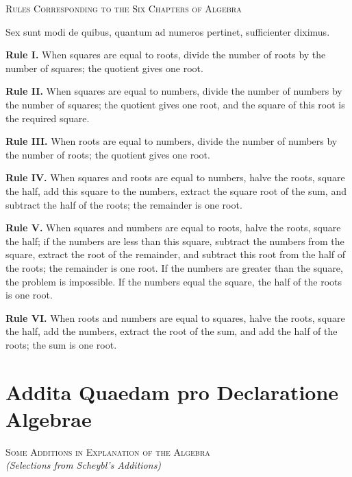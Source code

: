 \documentclass[11pt,a4paper]{book}
\begin{document}
\begin{center}
\textsc{Rules Corresponding to the Six Chapters of Algebra}
\end{center}

\textlatin{Sex sunt modi de quibus, quantum ad numeros pertinet, sufficienter diximus.}

\smallskip

\textbf{Rule I.} When squares are equal to roots, divide the number of roots by the number of squares; the quotient gives one root.

\textbf{Rule II.} When squares are equal to numbers, divide the number of numbers by the number of squares; the quotient gives one root, and the square of this root is the required square.

\textbf{Rule III.} When roots are equal to numbers, divide the number of numbers by the number of roots; the quotient gives one root.

\textbf{Rule IV.} When squares and roots are equal to numbers, halve the roots, square the half, add this square to the numbers, extract the square root of the sum, and subtract the half of the roots; the remainder is one root.

\textbf{Rule V.} When squares and numbers are equal to roots, halve the roots, square the half; if the numbers are less than this square, subtract the numbers from the square, extract the root of the remainder, and subtract this root from the half of the roots; the remainder is one root. If the numbers are greater than the square, the problem is impossible. If the numbers equal the square, the half of the roots is one root.

\textbf{Rule VI.} When roots and numbers are equal to squares, halve the roots, square the half, add the numbers, extract the root of the sum, and add the half of the roots; the sum is one root.

\chapter*{Addita Quaedam pro Declaratione\\ Algebrae}

\begin{center}
\textsc{Some Additions in Explanation of the Algebra}\\
\textit{(Selections from Scheybl's Additions)}
\end{center}
\end{document}
